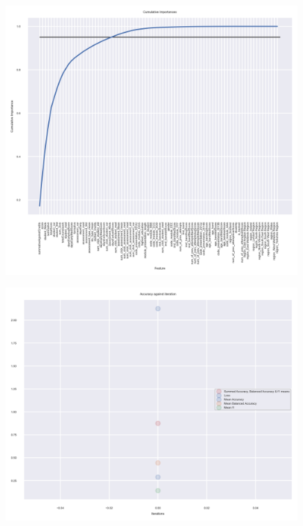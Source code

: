 \documentclass[11pt, a4paper, twocolumn]{article}
\begin{document}
\begin{figure}[h]
	\includegraphics[width=0.99\linewidth]{Importances.png} 
	\label{fig:importances}
	\caption{}
\end{figure}
\centering
\begin{figure}[h]
	\includegraphics[width=0.99\linewidth]{Accuracy_against_iteration1.png} 
	\label{fig:Acc1}
	\caption{}
\end{figure}
\centering
\end{document}
